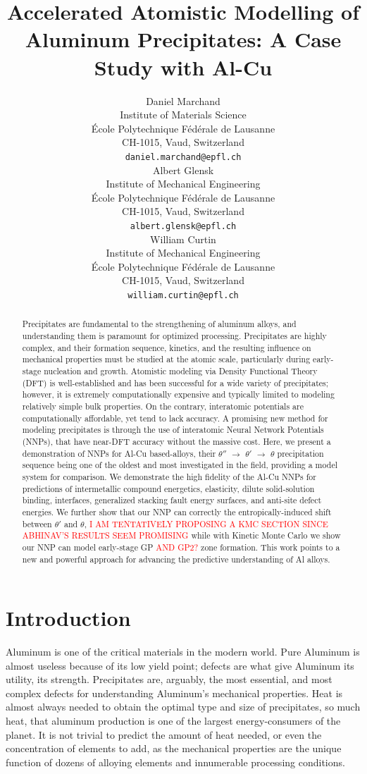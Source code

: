 \documentclass{article}
\title{Accelerated Atomistic Modelling of Aluminum Precipitates: A Case Study with Al-Cu}
\author{
 Daniel Marchand \\
  Institute of Materials Science \\
  École Polytechnique Fédérale de Lausanne \\
  CH-1015, Vaud, Switzerland \\
  \texttt{daniel.marchand@epfl.ch} \\
   \And
 Albert Glensk \\
  Institute of Mechanical Engineering \\
  École Polytechnique Fédérale de Lausanne \\
  CH-1015, Vaud, Switzerland \\
  \texttt{albert.glensk@epfl.ch} \\
  \And
 William Curtin \\
  Institute of Mechanical Engineering \\
  École Polytechnique Fédérale de Lausanne \\
  CH-1015, Vaud, Switzerland \\
  \texttt{william.curtin@epfl.ch} \\
}
\begin{document}
\maketitle
\begin{abstract}
Precipitates are fundamental to the strengthening of aluminum alloys, and understanding them is paramount for optimized processing.
Precipitates are highly complex, and their formation sequence, kinetics, and the resulting influence on mechanical properties must be studied at the atomic scale, particularly during early-stage nucleation and growth.
Atomistic modeling via Density Functional Theory (DFT) is well-established and has been successful for a wide variety of precipitates; however, it is extremely computationally expensive and typically limited to modeling relatively simple bulk properties. On the contrary, interatomic potentials are computationally affordable, yet tend to lack accuracy. A promising new method for modeling precipitates is through the use of interatomic Neural Network Potentials (NNPs), that have near-DFT accuracy without the massive cost. 
Here, we present a demonstration of NNPs for Al-Cu based-alloys, 
their $\theta''$ $\rightarrow$ $\theta'$ $\rightarrow$ $\theta$ precipitation sequence
being one of the oldest and most investigated in the field, providing a model system for comparison.
We demonstrate the high fidelity of the Al-Cu NNPs for predictions of intermetallic compound energetics, elasticity, dilute solid-solution binding, interfaces, generalized stacking fault energy surfaces, and anti-site defect energies.
We further show that our NNP can correctly the entropically-induced shift between $\theta'$ and $\theta$, 
\textcolor{red}{I AM TENTATIVELY PROPOSING A KMC SECTION SINCE ABHINAV'S RESULTS SEEM PROMISING} while with Kinetic Monte Carlo we show our NNP can model early-stage GP \textcolor{red}{AND GP2?} zone formation.
This work points to a new and powerful approach for advancing the predictive understanding of Al alloys. 
\end{abstract}




\section{Introduction}
Aluminum is one of the critical materials in the modern world.
Pure Aluminum is almost useless because of its low yield point\cite{Nie2014PhysicalAlloys}; defects are what give Aluminum its utility, its strength.
Precipitates are, arguably, the most essential, and most complex defects for understanding Aluminum's mechanical properties.
Heat is almost always needed to obtain the optimal type and size of precipitates, so much heat, that aluminum production is one of the largest energy-consumers of the planet\cite{Raabe2019StrategiesMetals}.
It is not trivial to predict the amount of heat needed, or even the concentration of elements to add, as the mechanical properties are the unique function of dozens of alloying elements and innumerable processing conditions.
\end{document}
